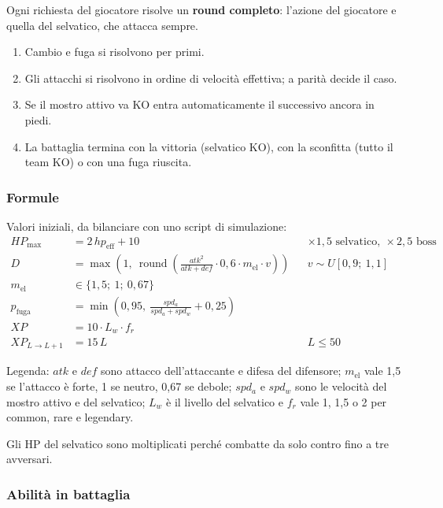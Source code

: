 \documentclass[11pt,a4paper]{article}
\begin{document}
Ogni richiesta del giocatore risolve un \textbf{round completo}: l'azione del giocatore e quella del selvatico, che attacca sempre.
\begin{enumerate}
  \item Cambio e fuga si risolvono per primi.
  \item Gli attacchi si risolvono in ordine di velocità effettiva; a parità decide il caso.
  \item Se il mostro attivo va KO entra automaticamente il successivo ancora in piedi.
  \item La battaglia termina con la vittoria (selvatico KO), con la sconfitta (tutto il team KO) o con una fuga riuscita.
\end{enumerate}

\subsubsection*{Formule}

Valori iniziali, da bilanciare con uno script di simulazione:
\begin{align*}
  HP_{\max} &= 2\,hp_{\text{eff}} + 10
    && \times 1{,}5 \text{ selvatico},\ \times 2{,}5 \text{ boss} \\
  D &= \max\!\left(1,\ \operatorname{round}\!\left(\frac{atk^2}{atk + def}\cdot 0{,}6 \cdot m_{\text{el}} \cdot v\right)\right)
    && v \sim U[0{,}9;\ 1{,}1] \\
  m_{\text{el}} &\in \{1{,}5;\ 1;\ 0{,}67\}
    && \\
  p_{\text{fuga}} &= \min\!\left(0{,}95,\ \frac{spd_{a}}{spd_{a} + spd_{w}} + 0{,}25\right)
    && \\
  XP &= 10 \cdot L_{w} \cdot f_r
    && \\
  XP_{L \to L+1} &= 15\,L
    && L \le 50
\end{align*}

Legenda: $atk$ e $def$ sono attacco dell'attaccante e difesa del difensore; $m_{\text{el}}$ vale 1,5 se l'attacco è forte, 1 se neutro, 0,67 se debole; $spd_a$ e $spd_w$ sono le velocità del mostro attivo e del selvatico; $L_w$ è il livello del selvatico e $f_r$ vale 1, 1,5 o 2 per common, rare e legendary.

Gli HP del selvatico sono moltiplicati perché combatte da solo contro fino a tre avversari.

\subsubsection*{Abilità in battaglia}
\end{document}

